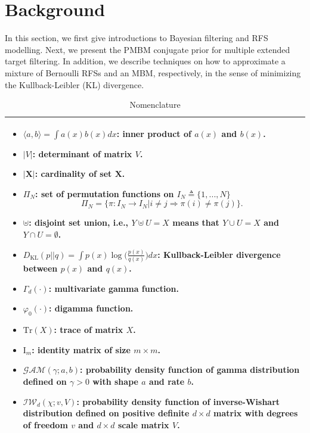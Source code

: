 \documentclass[journal]{IEEEtran}
\begin{document}
\section{Background}
In this section, we first give introductions to Bayesian filtering and RFS modelling. Next, we present the PMBM conjugate prior for multiple extended target filtering. In addition, we describe techniques on how to approximate a mixture of Bernoulli RFSs and an MBM, respectively, in the sense of minimizing the Kullback-Leibler (KL) divergence.


\begin{table}[!t]
\footnotesize
\caption{Nomenclature}
\label{tab:notations}
\centering
\begin{tabular}{l}
  \hline
  \begin{minipage}{0.45\textwidth}
    \vskip 1pt
    \begin{itemize}
    \item $\langle a,b\rangle=\int a(x)b(x)dx$: inner product of $a(x)$ and $b(x)$.
    \item $|V|$: determinant of matrix $V$.
    \item $|\mathbf{X}|$: cardinality of set $\mathbf{X}$.
   \item $\Pi_N$: set of permutation functions on $I_N \triangleq \{1,...,N\}$
   $$\Pi_N = \{\pi:I_N\rightarrow I_N|i\neq j\Rightarrow \pi(i)\neq\pi(j)\}.$$
   \item $\uplus$: disjoint set union, i.e., $Y\uplus U=X$ means that $Y\cup U=X$ and $Y\cap U=\emptyset$.
   \item $D_{\text{KL}}(p||q)=\int p(x)\log\big(\frac{p(x)}{q(x)}\big)dx$: Kullback-Leibler divergence between $p(x)$ and $q(x)$.
   \item $\Gamma_d(\cdot)$: multivariate gamma function.
   \item $\varphi_0(\cdot)$: digamma function.
   \item $\text{Tr}(X)$: trace of matrix $X$.
   \item $\text{I}_m$: identity matrix of size $m\times m$.
   \item $\mathcal{GAM}(\gamma;a,b)$: probability density function of gamma distribution defined on $\gamma > 0$ with shape $a$ and rate $b$.
   \item $\mathcal{IW}_d(\chi;v,V)$: probability density function of inverse-Wishart distribution defined on positive definite $d\times d$ matrix with degrees of freedom $v$ and $d\times d$ scale matrix $V$.
   \end{itemize}
   \vskip 1pt
 \end{minipage}
 \\
  \hline
 \end{tabular}
\end{table}
\end{document}
